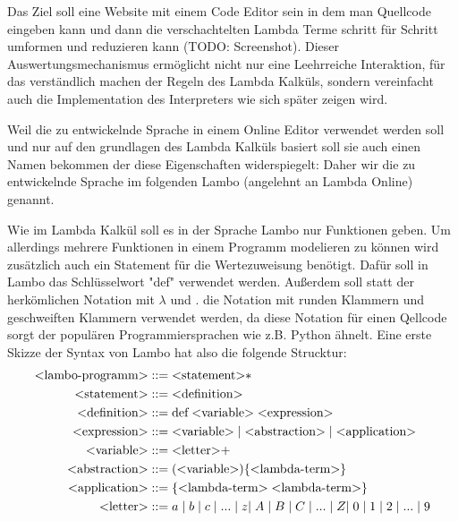 \documentclass[ngerman]{article}
\begin{document}
Das Ziel soll eine Website mit einem Code Editor sein in dem man Quellcode eingeben kann und dann die verschachtelten Lambda Terme schritt für Schritt umformen und reduzieren kann (TODO: Screenshot). Dieser Auswertungsmechanismus ermöglicht nicht nur eine Leehrreiche Interaktion, für das verständlich machen der Regeln des Lambda Kalküls, sondern vereinfacht auch die Implementation des Interpreters wie sich später zeigen wird.

Weil die zu entwickelnde Sprache in einem Online Editor verwendet werden soll und nur auf den grundlagen des Lambda Kalküls basiert soll sie auch einen Namen bekommen der diese Eigenschaften widerspiegelt:
Daher wir die zu entwickelnde Sprache im folgenden Lambo (angelehnt an Lambda Online) genannt.

Wie im Lambda Kalkül soll es in der Sprache Lambo nur Funktionen geben. 
Um allerdings mehrere Funktionen in einem Programm modelieren zu können wird zusätzlich auch ein Statement für die Wertezuweisung benötigt. Dafür soll in Lambo das Schlüsselwort "def" verwendet werden. Außerdem soll statt der herkömlichen Notation mit $\lambda$ und . die Notation mit runden Klammern und geschweiften Klammern verwendet werden, da diese Notation für einen Qellcode sorgt der populären Programmiersprachen wie z.B. Python ähnelt.
Eine erste Skizze der Syntax von Lambo hat also die folgende Strucktur:
\begin{align*}
    \text{\textless lambo-programm\textgreater} & ::= \text{\textless statement\textgreater}* \\
    \text{\textless statement\textgreater} & ::= \text{\textless definition\textgreater} \\
    \text{\textless definition\textgreater} & ::= \text{def} \; \text{\textless variable\textgreater} \; \text{\textless expression\textgreater}\\
    \text{\textless expression\textgreater} & ::= \text{\textless variable\textgreater} \; | \; \text{\textless abstraction\textgreater} \; | \; \text{\textless application\textgreater}\\
    \text{\textless variable\textgreater} & ::= \text{\textless letter\textgreater +} \\
    \text{\textless abstraction\textgreater} & ::= (\text{\textless variable\textgreater})\{\text{\textless lambda-term\textgreater}\}\\
    \text{\textless application\textgreater} & ::= \{\text{\textless lambda-term\textgreater} \; \text{\textless lambda-term\textgreater}\} \\
    \text{\textless letter\textgreater} & ::= a \; | \; b \; | \; c \; | \; ... \; | \; z | \; A \; | \; B \; | \; C \; | \; ... \; | \; Z | \; 0 \; | \; 1 \; | \; 2 \; | \; ... \; | \; 9
\end{align*}
\end{document}
